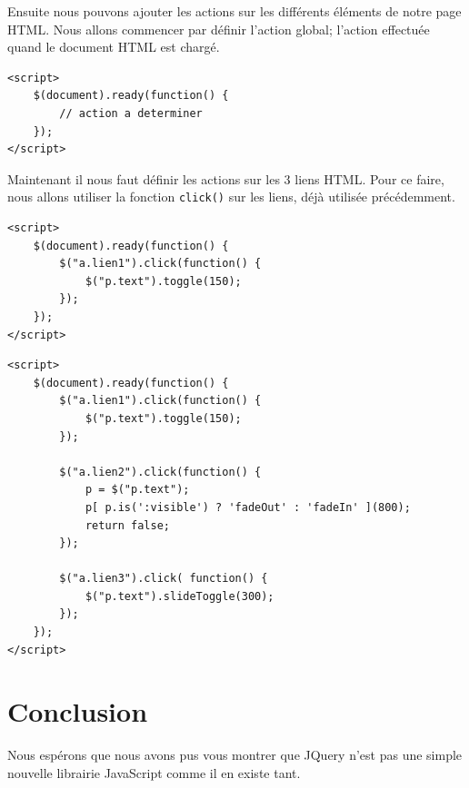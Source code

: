 \documentclass[10pt,a4paper,titlepage]{article}
\begin{document}
Ensuite nous pouvons ajouter les actions sur les différents éléments de notre page HTML. Nous allons commencer par définir l'action global; l'action effectuée quand le document HTML est chargé. 

\begin{lstlisting}
<script>
	$(document).ready(function() {		
		// action a determiner
	});
</script>
\end{lstlisting}

Maintenant il nous faut définir les actions sur les 3 liens HTML. Pour ce faire, nous allons utiliser la fonction \texttt{click()} sur les liens, déjà utilisée précédemment. 

\begin{lstlisting}
<script>
	$(document).ready(function() {		
		$("a.lien1").click(function() {
			$("p.text").toggle(150);
		});
	});
</script>
\end{lstlisting}



\begin{lstlisting}
<script>
	$(document).ready(function() {		
		$("a.lien1").click(function() {
			$("p.text").toggle(150);
		});

		$("a.lien2").click(function() {
			p = $("p.text");
		    p[ p.is(':visible') ? 'fadeOut' : 'fadeIn' ](800);
		    return false;
		});	
		
		$("a.lien3").click( function() {
			$("p.text").slideToggle(300); 
		});
	});
</script>
\end{lstlisting}





\newpage
\section{Conclusion}

Nous espérons que nous avons pus vous montrer que JQuery n'est pas une simple nouvelle librairie JavaScript comme il en existe tant. 

% 
%
% 
% 
\end{document}
